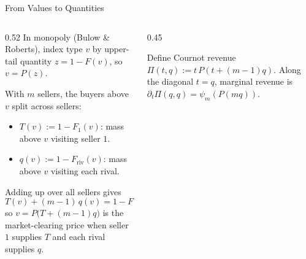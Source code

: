 \documentclass[11pt,aspectratio=169]{beamer}
\def\seg#1#2#3#4{\fill[#3,draw=InkTwo,line width=0.3pt] (#1,#4) rectangle (#2,#4+0.42);}
\begin{document}
\begin{frame}{From Values to Quantities}
\begin{columns}[T]
\begin{column}{0.52\textwidth}
In monopoly (Bulow \& Roberts), index type $v$ by upper-tail quantity $z=1-F(v)$, so $v=P(z)$.

\medskip{}
With $m$ sellers, the buyers above $v$ split across sellers:
\begin{itemize}
\item $T(v):=1-F_1(v)$: mass above $v$ visiting seller $1$.
\item $q(v):=1-F_{\mathrm{riv}}(v)$: mass above $v$ visiting each rival.
\end{itemize}

Adding up over all sellers gives
\[
T(v)+(m-1)\,q(v)=1-F(v),
\]
so $v=P\bigl(T+(m-1)q\bigr)$ is the market-clearing price when seller $1$ supplies $T$ and each rival supplies $q$.
\end{column}
\begin{column}{0.45\textwidth}
\centering{}

\medskip
{\scriptsize Define Cournot revenue $\Pi(t,q):=t\,P(t+(m-1)q)$. Along the diagonal $t=q$, marginal revenue is $\partial_t\Pi(q,q)=\psi_m(P(mq))$.}
\end{column}
\end{columns}
\end{frame}
\end{document}
